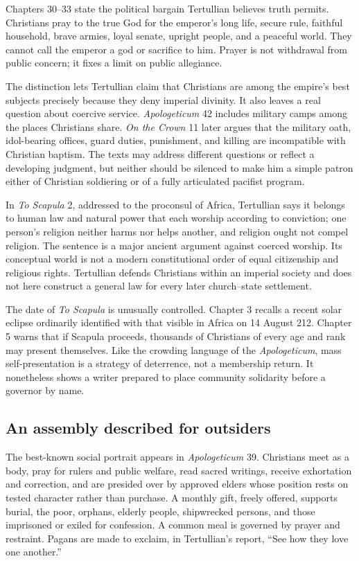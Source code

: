Chapters 30--33 state the political bargain Tertullian believes truth permits.
Christians pray to the true God for the emperor's long life, secure rule,
faithful household, brave armies, loyal senate, upright people, and a peaceful
world. They cannot call the emperor a god or sacrifice to him. Prayer is not
withdrawal from public concern; it fixes a limit on public allegiance.

The distinction lets Tertullian claim that Christians are among the empire's
best subjects precisely because they deny imperial divinity. It also leaves a
real question about coercive service. \emph{Apologeticum} 42 includes military
camps among the places Christians share. \emph{On the Crown} 11 later argues
that the military oath, idol-bearing offices, guard duties, punishment, and
killing are incompatible with Christian baptism. The texts may address
different questions or reflect a developing judgment, but neither should be
silenced to make him a simple patron either of Christian soldiering or of a
fully articulated pacifist program.

In \emph{To Scapula} 2, addressed to the proconsul of Africa, Tertullian says it
belongs to human law and natural power that each worship according to
conviction; one person's religion neither harms nor helps another, and religion
ought not compel religion. The sentence is a major ancient argument against
coerced worship. Its conceptual world is not a modern constitutional order of
equal citizenship and religious rights. Tertullian defends Christians within
an imperial society and does not here construct a general law for every later
church--state settlement.

The date of \emph{To Scapula} is unusually controlled. Chapter 3 recalls a
recent solar eclipse ordinarily identified with that visible in Africa on 14
August 212. Chapter 5 warns that if Scapula proceeds, thousands of Christians
of every age and rank may present themselves. Like the crowding language of the
\emph{Apologeticum}, mass self-presentation is a strategy of deterrence, not a
membership return. It nonetheless shows a writer prepared to place community
solidarity before a governor by name.

\subsection{An assembly described for outsiders}

The best-known social portrait appears in \emph{Apologeticum} 39. Christians
meet as a body, pray for rulers and public welfare, read sacred writings,
receive exhortation and correction, and are presided over by approved elders
whose position rests on tested character rather than purchase. A monthly gift,
freely offered, supports burial, the poor, orphans, elderly people, shipwrecked
persons, and those imprisoned or exiled for confession. A common meal is
governed by prayer and restraint. Pagans are made to exclaim, in Tertullian's
report, ``See how they love one another.''


